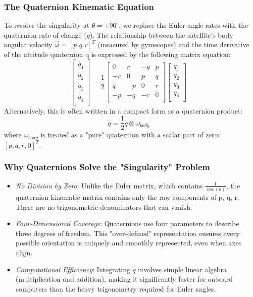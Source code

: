 \documentclass[a4paper,10pt]{article}
\begin{document}
\subsubsection{The Quaternion Kinematic Equation}
To resolve the singularity at \( \theta = \pm 90^{\circ}\), we replace the Euler angle rates with the quaternion rate of change (\(\dot{q}\)). The relationship between the satellite's body angular velocity \( \vec{\omega} = [ p\,\, q\,\, r ]^T \) (measured by gyroscopes) and the time derivative of the attitude quaternion q is expressed by the following matrix equation:
\[
\begin{bmatrix}
\dot{q_1}\\
\dot{q_2}\\
\dot{q_3}\\
\dot{q_4}\\
\end{bmatrix}
= \frac{1}{2}
\begin{bmatrix}
0&r&-q&p\\
-r&0&p&q\\
q&-p&0&r\\
-p&-q&-r&0\\
\end{bmatrix}
\begin{bmatrix}
q_1\\
q_2\\
q_3\\
q_4\\
\end{bmatrix}
\]
Alternatively, this is often written in a compact form as a quaternion product:
\[
 \dot{q}=\frac{1}{2}q \otimes \omega_{body}
\]
where \(  \omega_{body} \) is treated as a "pure" quaternion with a scalar part of zero: \([p,q,r,0]^{T}\).
\subsubsection{Why Quaternions Solve the "Singularity" Problem}
\begin{itemize}
\item \emph{No Division by Zero}: Unlike the Euler matrix, which contains \( \frac{1}{\cos(\theta)}\), the quaternion kinematic matrix contains only the raw components of p, q, r. There are no trigonometric denominators that can vanish.
\item \emph{Four-Dimensional Coverage}: Quaternions use four parameters to describe three degrees of freedom. This "over-defined" representation ensures every possible orientation is uniquely and smoothly represented, even when axes align.
\item \emph{Computational Efficiency}: Integrating \( \dot{q} \) involves simple linear algebra (multiplication and addition), making it significantly faster for onboard computers than the heavy trigonometry required for Euler angles.
\end{itemize}
\end{document}
